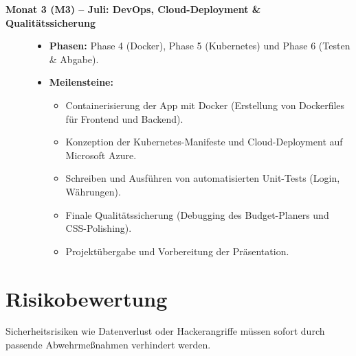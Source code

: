 \documentclass[11pt,a4paper]{article}
\begin{document}
\begin{description}
    \item[\textbf{Monat 3 (M3) -- Juli: DevOps, Cloud-Deployment \& Qualitätssicherung}]
    \begin{itemize}
        \item \textbf{Phasen:} Phase 4 (Docker), Phase 5 (Kubernetes) und Phase 6 (Testen \& Abgabe).
        \item \textbf{Meilensteine:}
        \begin{itemize}
            \item Containerisierung der App mit Docker (Erstellung von Dockerfiles für Frontend und Backend).
            \item Konzeption der Kubernetes-Manifeste und Cloud-Deployment auf Microsoft Azure.
            \item Schreiben und Ausführen von automatisierten Unit-Tests (Login, Währungen).
            \item Finale Qualitätssicherung (Debugging des Budget-Planers und CSS-Polishing).
            \item Projektübergabe und Vorbereitung der Präsentation.
        \end{itemize}
    \end{itemize}
\end{description}

\newpage

\section{Risikobewertung}

\begin{tcolorbox}[colback=bglight, colframe=accentred, arc=4pt, title=\textbf{\color{white}Sicherheitswarnung}]
Sicherheitsrisiken wie Datenverlust oder Hackerangriffe müssen sofort durch passende Abwehrmeßnahmen verhindert werden.
\end{tcolorbox}
\end{document}
